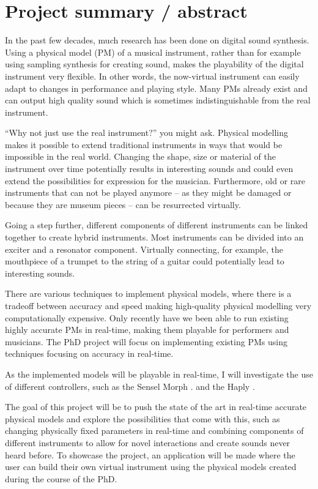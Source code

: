 \section{Project summary / abstract}

In the past few decades, much research has been done on digital sound synthesis. Using a physical model (PM) of a musical instrument, rather than for example using sampling synthesis for creating sound, makes the playability of the digital instrument very flexible. In other words, the now-virtual instrument can easily adapt to changes in performance and playing style. Many PMs already exist and can output high quality sound which is sometimes indistinguishable from the real instrument.

“Why not just use the real instrument?” you might ask. Physical modelling makes it possible to extend traditional instruments in ways that would be impossible in the real world. Changing the shape, size or material of the instrument over time potentially results in interesting sounds and could even extend the possibilities for expression for the musician. Furthermore, old or rare instruments that can not be played anymore -- as they might be damaged or because they are museum pieces -- can be resurrected virtually.

Going a step further, different components of different instruments can be linked together to create hybrid instruments. Most instruments can be divided into an exciter and a resonator component. Virtually connecting, for example, the mouthpiece of a trumpet to the string of a guitar could potentially lead to interesting sounds.

There are various techniques to implement physical models, where there is a tradeoff between accuracy and speed making high-quality physical modelling very computationally expensive. Only recently have we been able to run existing highly accurate PMs in real-time, making them playable for performers and musicians. The PhD project will focus on implementing existing PMs using techniques focusing on accuracy in real-time.

As the implemented models will be playable in real-time, I will investigate the use of different controllers, such as the Sensel Morph \cite{Sensel2019}. and the Haply \cite{Haply2019}.

The goal of this project will be to push the state of the art in real-time accurate physical models and explore the possibilities that come with this, such as changing physically fixed parameters in real-time and combining components of different instruments to allow for novel interactions and create sounds never heard before. To showcase the project, an application will be made where the user can build their own virtual instrument using the physical models created during the course of the PhD. 

